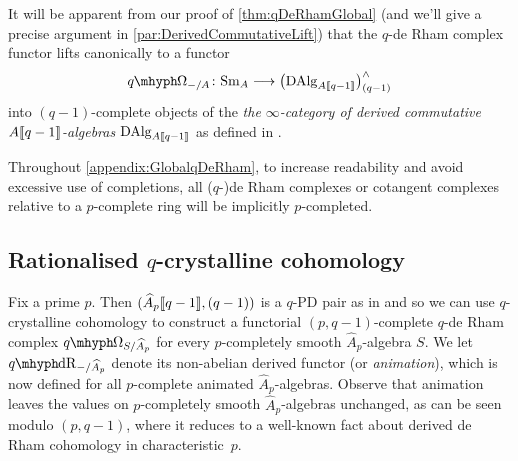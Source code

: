 \documentclass[DIV=12,numbers=enddot,leqno,bibliography=totoc]{scrartcl}
\begin{document}
	\begin{rem}\label{rem:DerivedCommutativeRingsqDeRham}
		It will be apparent from our proof of \cref{thm:qDeRhamGlobal} (and we'll give a precise argument in \cref{par:DerivedCommutativeLift}) that the $q$-de Rham complex functor lifts canonically to a functor
		\begin{equation*}
			\qOmega_{-/A}\colon \cat{Sm}_A\longrightarrow \bigl(\DAlg_{A\qpower}\bigr)_{(q-1)}^\complete
		\end{equation*}
		into $(q-1)$-complete objects of the \emph{the $\infty$-category of derived commutative $A\llbracket q-1\rrbracket$-algebras} $\operatorname{DAlg}_{A\llbracket q-1\rrbracket}$ as defined in \cite[Definition~]{RaksitFilteredCircle}.
	\end{rem}
	\begin{numpar}[Convention.]\label{conv:ImplicitCompletion}
		Throughout \cref{appendix:GlobalqDeRham}, to increase readability and avoid excessive use of completions, all ($q$-)de Rham complexes or cotangent complexes relative to a $p$-complete ring will be implicitly $p$-completed.
	\end{numpar}
	
	\subsection{Rationalised \texorpdfstring{$q$}{q}-crystalline cohomology}\label{subsec:RationalisedqDeRham}
	
	Fix a prime $p$. Then $(\widehat{A}_p\llbracket q-1\rrbracket,(q-1))$ is a $q$-PD pair as in \cite[Definition~]{Prismatic} and so we can use $q$-crystalline cohomology to construct a functorial $(p,q-1)$-complete $q$-de Rham complex $\qOmega_{S/\smash{\widehat{A}}_p}$ for every $p$-completely smooth $\widehat{A}_p$-algebra $S$. We let $\qdeRham_{-/\smash{\widehat{A}}_p}$ denote its non-abelian derived functor (or \emph{animation}), which is now defined for all $p$-complete animated $\widehat{A}_p$-algebras. Observe that animation leaves the values on $p$-completely smooth $\widehat{A}_p$-algebras unchanged, as can be seen modulo $(p,q-1)$, where it reduces to a well-known fact about derived de Rham cohomology in characteristic~$p$.
	
\end{document}
